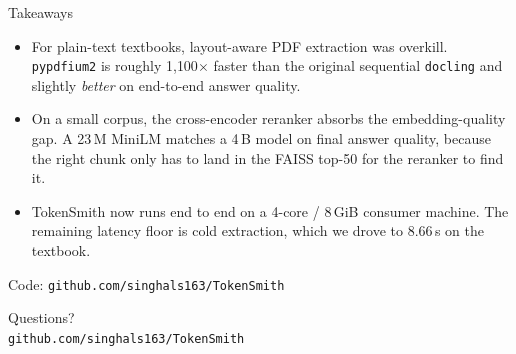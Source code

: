 \documentclass[aspectratio=169,11pt]{beamer}
\begin{document}
\begin{frame}{Takeaways}
\begin{itemize}
  \item For plain-text textbooks, layout-aware PDF extraction was
    overkill. \texttt{pypdfium2} is roughly 1{,}100$\times$ faster
    than the original sequential \texttt{docling} and slightly
    \emph{better} on end-to-end answer quality.
  \medskip
  \item On a small corpus, the cross-encoder reranker absorbs the
    embedding-quality gap. A 23\,M MiniLM matches a 4\,B model on
    final answer quality, because the right chunk only has to land in
    the FAISS top-50 for the reranker to find it.
  \medskip
  \item TokenSmith now runs end to end on a 4-core / 8\,GiB consumer
    machine. The remaining latency floor is cold extraction, which we
    drove to 8.66\,s on the textbook.
\end{itemize}

\bigskip
\centering
\small
Code: \texttt{github.com/singhals163/TokenSmith}

\end{frame}

\begin{frame}
  \centering
  {\Huge Questions?}\\[2em]
  \small \texttt{github.com/singhals163/TokenSmith}
\end{frame}
\end{document}
